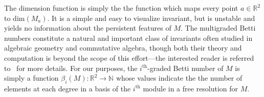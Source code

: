 \documentclass[sn-mathphys]{sn-jnl}
\begin{document}
The dimension function is simply the the function which maps every point $a \in \mathbb{R}^2$ to $\mathrm{dim}(M_a)$. It is a simple and easy to visualize invariant, but is unstable and yields no information about the persistent features of $M$. 
The multigraded Betti numbers constitute a natural and important class of invariants often studied in algebraic geometry and commutative algebra, though both their theory and computation is beyond the scope of this effort---the interested reader is referred to~\cite{lesnick2015interactive, carlsson2009theory} for more details. For our purposes, the $i^{\text{th}}$-graded Betti number of $M$ is simply a function $\beta_i(M): \mathbb{R}^2 \to \mathbb{N}$ whose values indicate the the number of elements at  each degree in a basis of the $i^{\text{th}}$ module in a free resolution for $M$. 
\end{document}
